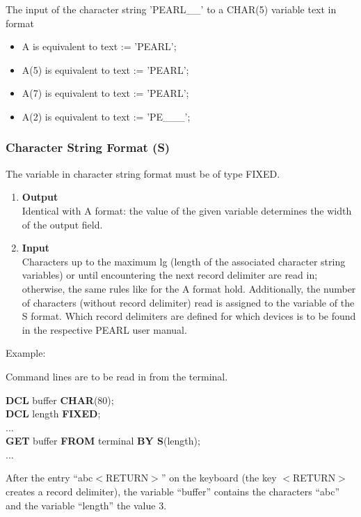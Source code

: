 The input of the character string 'PEARL\_\_' to a CHAR(5) variable text in
format

\begin{itemize}
\item A is equivalent to text := 'PEARL';
\item A(5) is equivalent to text := 'PEARL';
\item A(7) is equivalent to text := 'PEARL';
\item A(2) is equivalent to text := 'PE\_\_\_';
\end{itemize}

\begin{removed}
\subsubsection{Character String Format (S)}

The variable in character string format must be of type FIXED.
\begin{enumerate}
\item {\bf Output}\\
Identical with A format: the value of the given variable determines the
width of the output field.
\item{\bf Input}\\
Characters up to the maximum lg (length of the associated character
string variables) or until encountering the next record delimiter are
read in; otherwise, the same rules like for the A format hold.
Additionally, the number of characters (without record delimiter) read
is assigned to the variable of the S format. Which record delimiters are
defined for which devices is to be found in the respective PEARL user
manual.
\end{enumerate}

Example:

Command lines are to be read in from the terminal.

{\bf DCL} buffer {\bf CHAR}(80);\\
{\bf DCL} length {\bf FIXED};\\
...\\
{\bf GET} buffer {\bf FROM} terminal {\bf BY S}(length);\\
...

After the entry ``abc$<$RETURN$>$'' on the keyboard (the key
$<$RETURN$>$ creates a record delimiter), the variable ``buffer''
contains the characters ``abc'' and the variable ``length'' the value 3.
\end{removed}


